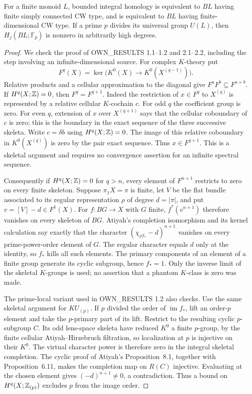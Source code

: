 \begin{proposition}
\label{CD:monoidfinitehomology}
For a finite monoid $L$, bounded integral homology is equivalent to
$BL$ having finite simply connected CW type, and is equivalent to
$BL$ having finite-dimensional CW type.  If a prime $p$ divides its
universal group $U(L)$, then $H_j(BL;\mathbb F_p)$ is nonzero in
arbitrarily high degrees.
\end{proposition}
\begin{proof}
We check the proof of OWN\_RESULTS 1.1--1.2 and 2.1--2.2, including
the step involving an infinite-dimensional source.  For complex
$K$-theory put
\[
 F^q(X)=\ker\bigl(K^0(X)\to K^0(X^{(q-1)})\bigr).
\]
Relative products and a cellular approximation to the diagonal give
$F^aF^b\subseteq F^{a+b}$.  If $H^q(X;\mathbb Z)=0$, then
$F^q=F^{q+1}$.  Indeed the restriction of $x\in F^q$ to $X^{(q)}$
is represented by a relative cellular $K$-cochain $c$.  For odd $q$
the coefficient group is zero.  For even $q$, extension of $x$ over
$X^{(q+1)}$ says that the cellular coboundary of $c$ is zero; this is
the boundary in the exact sequence of the three successive skeleta.
Write $c=\delta b$ using $H^q(X;\mathbb Z)=0$.  The image of this relative
coboundary in $K^0(X^{(q)})$ is zero by the pair exact sequence.
Thus $x\in F^{q+1}$.  This is a skeletal argument and requires no
convergence assertion for an infinite spectral sequence.

Consequently if $H^q(X;\mathbb Z)=0$ for $q>n$, every element of
$F^{n+1}$ restricts to zero on every finite skeleton.  Suppose
$\pi_1X=\pi$ is finite, let $V$ be the flat bundle associated to
its regular representation $\rho$ of degree $d=|\pi|$, and put
$v=[V]-d\in F^1(X)$.  For $f:BG\to X$ with $G$ finite,
$f^*(v^{n+1})$ therefore vanishes on every skeleton of $BG$.
Atiyah's completion isomorphism and its kernel calculation
\cite[Propositions 6.10--6.11 and Theorem 7.2]{CDAtiyah1961}
say exactly that the character
$(\chi_{\rho f_*}-d)^{n+1}$ vanishes on every prime-power-order
element of $G$.  The regular character equals $d$ only at the
identity, so $f_*$ kills all such elements.  The primary components
of an element of a finite group generate its cyclic subgroup, hence
$f_*=1$.  Only the inverse limit of the skeletal $K$-groups is used;
no assertion that a phantom $K$-class is zero was made.

The prime-local variant used in OWN\_RESULTS 1.2 also checks.
Use the same skeletal argument for $KU_{(p)}$.  If $p$ divided the
order of $\operatorname{im}f_*$, lift an order-$p$ element and take
the $p$-primary part of its lift.  Restrict to the resulting cyclic
$p$-subgroup $C$.  Its odd lens-space skeleta have reduced $K^0$
a finite $p$-group, by the finite cellular Atiyah--Hirzebruch
filtration, so localization at $p$ is injective on their $K^0$.
The virtual character power is therefore zero in the integral
skeletal completion.  The cyclic proof of Atiyah's Proposition~8.1,
together with Proposition~6.11, makes the completion map on $R(C)$
injective.  Evaluating at the chosen element gives
$(-d)^{n+1}\ne0$, a contradiction.  Thus a bound on
$H^q(X;\mathbb Z_{(p)})$ excludes $p$ from the image order.


\end{proof}
